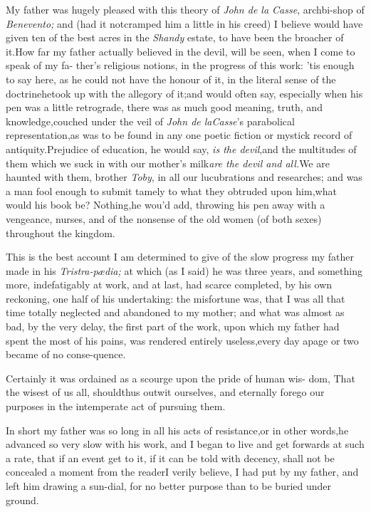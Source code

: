 \documentclass{article}
\begin{document}
My father was hugely pleased with this theory of \textit{John de la
Casse}, archbi-\break shop of \textit{Benevento;} and (had it not\break cramped
him a little in his creed) I believe would have given ten of the best
acres in the \textit{Shandy} estate, to have been the broacher of
it.\tsk How far my father actually believed in the devil, will be seen,
when I come to speak of my fa- ther’s religious notions, in the
progress of this work: ’tis enough to say here, as he could not have the
honour of it, in the literal sense of the doctrine\tsk he\break took up with
the allegory of it;\tsk and would often say, especially when his pen was
a little retrograde, there was as much good meaning, truth, and
knowledge,\break couched under the veil of \textit{John de la\break Casse}’s
parabolical representation,\tsk as was to be found in any one poetic
fiction or mystick record of antiquity.\tsk Preju\-dice of education, he
would say, \textit{is the devil},\tsk and the multitudes of them which
we suck in with our mother’s milk\tsk \textit{are the devil and
all.}\tsh We are haunted with them, brother \textit{Toby}, in all our
lucubrations and researches; and was a man fool enough to submit tamely
to what they obtruded upon him,\tsk what would his book be?
Nothing,\tsk he wou’d add, throwing his pen away with a vengeance,
 nurses, and of the nonsense of
the old women (of both sexes) throughout the kingdom.

This is the best account I am determined to give of the slow
progress my father made in his \textit{Tristra-pædia;} at
which (as I said) he was three years, and something more,
indefatigably at work, and\break
at last, had scarce completed, by his\break
own reckoning, one half of his undertaking: the misfortune was,
that I was all that time totally neglected and abandoned to my
mother; and what was almost as bad, by the very delay, the first
part of the work, upon which my father had spent the most of his
pains, was rendered entirely useless,\tsh every day a\break page
or two became of no conse-\break quence.\tsh

\tsh Certainly it was ordained as a scourge upon the
pride of human wis-
dom, That the wisest of us all, should\break thus outwit ourselves, and
eternally fore\-go our purposes in the intemperate act of pursuing them.

In short my father was so long in all his acts of resistance,\tsk or in
other words,\break\tsk he advanced so very slow with his work, and I began to
live and get forwards at such a rate, that if an event  get to it, if it can be told with decency,
shall not be concealed a moment from the reader\tsh I verily believe, I
had put by my father, and left him drawing a sun-dial, for no better
purpose than to be buried under ground.
\end{document}
